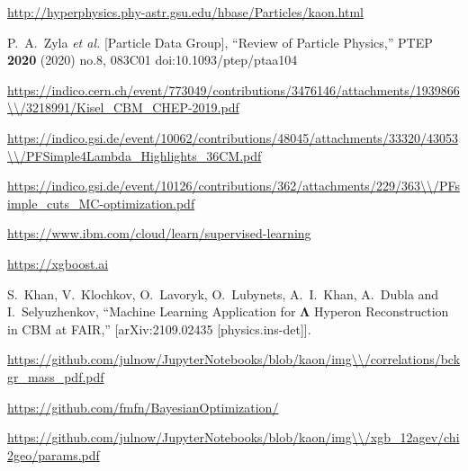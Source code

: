 \documentclass[12pt,a4paper]{report}
\begin{document}
\begin{thebibliography}{9}
\url{http://hyperphysics.phy-astr.gsu.edu/hbase/Particles/kaon.html}

P.~A.~Zyla \textit{et al.} [Particle Data Group],
``Review of Particle Physics,''
PTEP \textbf{2020} (2020) no.8, 083C01
doi:10.1093/ptep/ptaa104

\url{https://indico.cern.ch/event/773049/contributions/3476146/attachments/1939866\\/3218991/Kisel\_CBM\_CHEP-2019.pdf}

\url{https://indico.gsi.de/event/10062/contributions/48045/attachments/33320/43053\\/PFSimple4Lambda\_Highlights\_36CM.pdf}

\url{https://indico.gsi.de/event/10126/contributions/362/attachments/229/363\\/PFsimple\_cuts\_MC-optimization.pdf}

\url{https://www.ibm.com/cloud/learn/supervised-learning}

\url{https://xgboost.ai}

S.~Khan, V.~Klochkov, O.~Lavoryk, O.~Lubynets, A.~I.~Khan, A.~Dubla and I.~Selyuzhenkov,
``Machine Learning Application for $\mathbf{\Lambda}$ Hyperon Reconstruction in CBM at FAIR,''
[arXiv:2109.02435 [physics.ins-det]].

\url{https://github.com/julnow/JupyterNotebooks/blob/kaon/img\\/correlations/bckgr\_mass\_pdf.pdf}

\url{https://github.com/fmfn/BayesianOptimization/}

\url{https://github.com/julnow/JupyterNotebooks/blob/kaon/img\\/xgb\_12agev/chi2geo/params.pdf}


\end{thebibliography}
\end{document}
